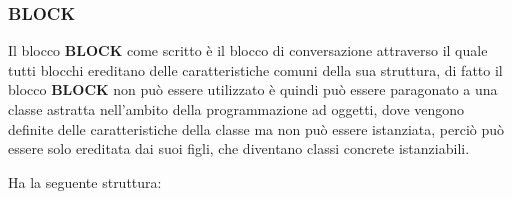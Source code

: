 \subsubsection{BLOCK}

Il blocco \textbf{BLOCK} come scritto è il blocco di conversazione attraverso il quale tutti blocchi ereditano delle caratteristiche comuni della sua struttura, di fatto il blocco \textbf{BLOCK} non può essere utilizzato è quindi può essere paragonato a una classe astratta nell'ambito della programmazione ad oggetti, dove vengono definite delle caratteristiche della classe ma non può essere istanziata, perciò può essere solo ereditata dai suoi figli, che diventano classi concrete istanziabili.


Ha la seguente struttura:

